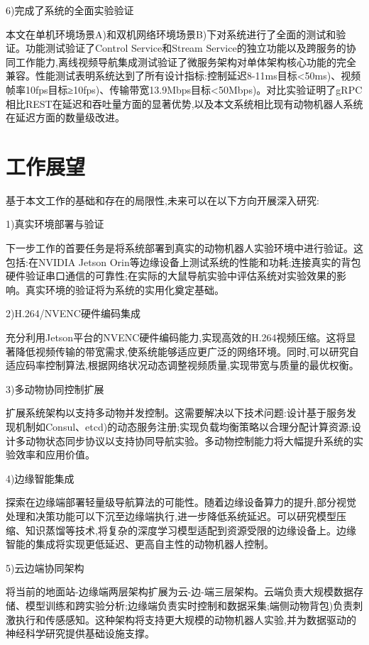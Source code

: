 6)完成了系统的全面实验验证

本文在单机环境场景A)和双机网络环境场景B)下对系统进行了全面的测试和验证。功能测试验证了Control Service和Stream Service的独立功能以及跨服务的协同工作能力,离线视频导航集成测试验证了微服务架构对单体架构核心功能的完全兼容。性能测试表明系统达到了所有设计指标:控制延迟8-11ms目标<50ms)、视频帧率10fps目标≥10fps)、传输带宽13.9Mbps目标<50Mbps)。对比实验证明了gRPC相比REST在延迟和吞吐量方面的显著优势,以及本文系统相比现有动物机器人系统在延迟方面的数量级改进。
\section{工作展望}
基于本文工作的基础和存在的局限性,未来可以在以下方向开展深入研究:

1)真实环境部署与验证

下一步工作的首要任务是将系统部署到真实的动物机器人实验环境中进行验证。这包括:在NVIDIA Jetson Orin等边缘设备上测试系统的性能和功耗;连接真实的背包硬件验证串口通信的可靠性;在实际的大鼠导航实验中评估系统对实验效果的影响。真实环境的验证将为系统的实用化奠定基础。

2)H.264/NVENC硬件编码集成

充分利用Jetson平台的NVENC硬件编码能力,实现高效的H.264视频压缩。这将显著降低视频传输的带宽需求,使系统能够适应更广泛的网络环境。同时,可以研究自适应码率控制算法,根据网络状况动态调整视频质量,实现带宽与质量的最优权衡。

3)多动物协同控制扩展

扩展系统架构以支持多动物并发控制。这需要解决以下技术问题:设计基于服务发现机制如Consul、etcd)的动态服务注册;实现负载均衡策略以合理分配计算资源;设计多动物状态同步协议以支持协同导航实验。多动物控制能力将大幅提升系统的实验效率和应用价值。

4)边缘智能集成

探索在边缘端部署轻量级导航算法的可能性。随着边缘设备算力的提升,部分视觉处理和决策功能可以下沉至边缘端执行,进一步降低系统延迟。可以研究模型压缩、知识蒸馏等技术,将复杂的深度学习模型适配到资源受限的边缘设备上。边缘智能的集成将实现更低延迟、更高自主性的动物机器人控制。

5)云边端协同架构

将当前的地面站-边缘端两层架构扩展为云-边-端三层架构。云端负责大规模数据存储、模型训练和跨实验分析;边缘端负责实时控制和数据采集;端侧动物背包)负责刺激执行和传感感知。这种架构将支持更大规模的动物机器人实验,并为数据驱动的神经科学研究提供基础设施支撑。




